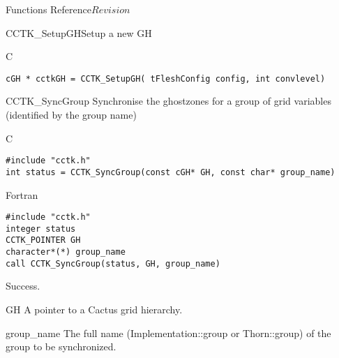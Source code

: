 \begin{cactuspart}{ Functions Reference}{}{$Revision$}
\begin{FunctionDescription}{CCTK\_SetupGH}{Setup a new GH}
\label{CCTK-SetupGH}
\begin{SynopsisSection}
\begin{Synopsis}{C}
\begin{verbatim}cGH * cctkGH = CCTK_SetupGH( tFleshConfig config, int convlevel)\end{verbatim}
\end{Synopsis}
\end{SynopsisSection}
\end{FunctionDescription}




\begin{FunctionDescription}{CCTK\_SyncGroup}
\label{CCTK-SyncGroup}
Synchronise the ghostzones for a group of grid variables
(identified by the group name)

\begin{SynopsisSection}
\begin{Synopsis}{C}
\begin{verbatim}
#include "cctk.h"
int status = CCTK_SyncGroup(const cGH* GH, const char* group_name)
\end{verbatim}
\end{Synopsis}
\begin{Synopsis}{Fortran}
\begin{verbatim}
#include "cctk.h"
integer status
CCTK_POINTER GH
character*(*) group_name
call CCTK_SyncGroup(status, GH, group_name)
\end{verbatim}
\end{Synopsis}
\end{SynopsisSection}

\begin{ResultSection}
\begin{Result}{0}
Success.
\end{Result}
\end{ResultSection}

\begin{ParameterSection}
\begin{Parameter}{GH}
A pointer to a Cactus grid hierarchy.
\end{Parameter}
\begin{Parameter}{group\_name}
The full name (Implementation::group or Thorn::group) of the group
to be synchronized.
\end{Parameter}
\end{ParameterSection}


\end{FunctionDescription}
\end{cactuspart}
